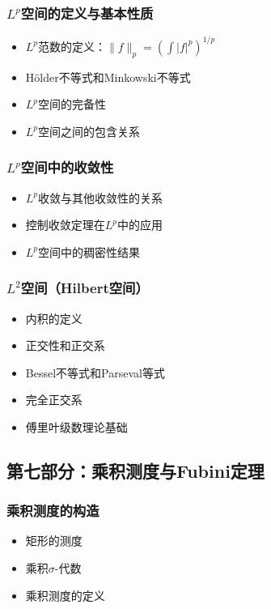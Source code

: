 \subsubsection{$L^p$空间的定义与基本性质}
\begin{itemize}
    \item $L^p$范数的定义：$\|f\|_p = \left(\int |f|^p\right)^{1/p}$
    \item Hölder不等式和Minkowski不等式
    \item $L^p$空间的完备性
    \item $L^p$空间之间的包含关系
\end{itemize}

\subsubsection{$L^p$空间中的收敛性}
\begin{itemize}
    \item $L^p$收敛与其他收敛性的关系
    \item 控制收敛定理在$L^p$中的应用
    \item $L^p$空间中的稠密性结果
\end{itemize}

\subsubsection{$L^2$空间（Hilbert空间）}
\begin{itemize}
    \item 内积的定义
    \item 正交性和正交系
    \item Bessel不等式和Parseval等式
    \item 完全正交系
    \item 傅里叶级数理论基础
\end{itemize}

\subsection{第七部分：乘积测度与Fubini定理}

\subsubsection{乘积测度的构造}
\begin{itemize}
    \item 矩形的测度
    \item 乘积$\sigma$-代数
    \item 乘积测度的定义
\end{itemize}

